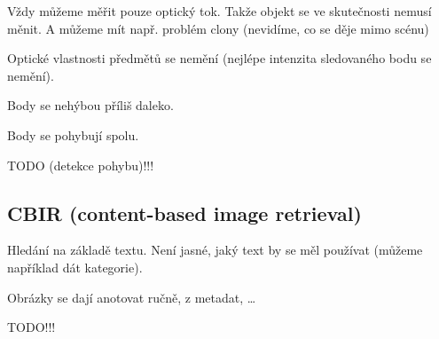 \documentclass[12pt]{article}					%
\begin{document}
\begin{poznamka}
	Vždy můžeme měřit pouze optický tok. Takže objekt se ve skutečnosti nemusí měnit. A můžeme mít např. problém clony (nevidíme, co se děje mimo scénu)
\end{poznamka}

\begin{poznamka}[Předpoklady]
	Optické vlastnosti předmětů se nemění (nejlépe intenzita sledovaného bodu se nemění).

	Body se nehýbou příliš daleko.

	Body se pohybují spolu.
\end{poznamka}

TODO (detekce pohybu)!!!



\subsection{CBIR (content-based image retrieval)}
\begin{definice}
	Hledání na základě textu. Není jasné, jaký text by se měl používat (můžeme například dát kategorie).

	Obrázky se dají anotovat ručně, z metadat, …
\end{definice}

TODO!!!
\end{document}
